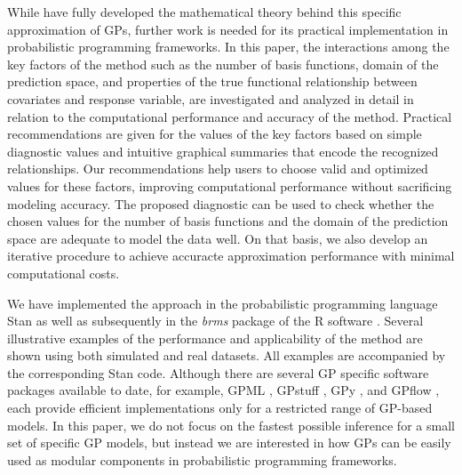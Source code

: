 While \citet{solin2018hilbert} have fully developed the mathematical theory behind this specific approximation of GPs, further work is needed for its practical implementation in probabilistic programming frameworks. In this paper, the interactions among the key factors of the method such as the number of basis functions, domain of the prediction space, and properties of the true functional relationship between covariates and response variable, are investigated and analyzed in detail in relation to the computational performance and accuracy of the method. Practical recommendations are given for the values of the key factors based on simple diagnostic values and intuitive graphical summaries that encode the recognized relationships. Our recommendations help users to choose valid and optimized values for these factors, improving computational performance without sacrificing modeling accuracy. The proposed diagnostic can be used to check whether the chosen values for the number of basis functions and the domain of the prediction space are adequate to model the data well. On that basis, we also develop an iterative procedure to achieve accuracte approximation performance with minimal computational costs.

We have implemented the approach in the probabilistic programming language Stan \citep{carpenter2017stan} as well as subsequently in the \textit{brms} package \citep{burkner2017brms} of the R software \citep{R2019R}. Several illustrative examples of the performance and applicability of the method are shown using both simulated and real datasets. All examples are accompanied by the corresponding Stan code. Although there are several GP specific software packages available to date, for example, GPML \citep{rasmussen2010gpml},  GPstuff \citep{vanhatalo2013gpstuff}, GPy \citep{gpy2014}, and GPflow \citep{GPflow2017}, each provide efficient implementations only for a restricted range of GP-based models. In this paper, we do not focus on the fastest possible inference for a small set of specific GP models, but instead we are interested in how GPs can be easily used as modular components in probabilistic programming frameworks. 

